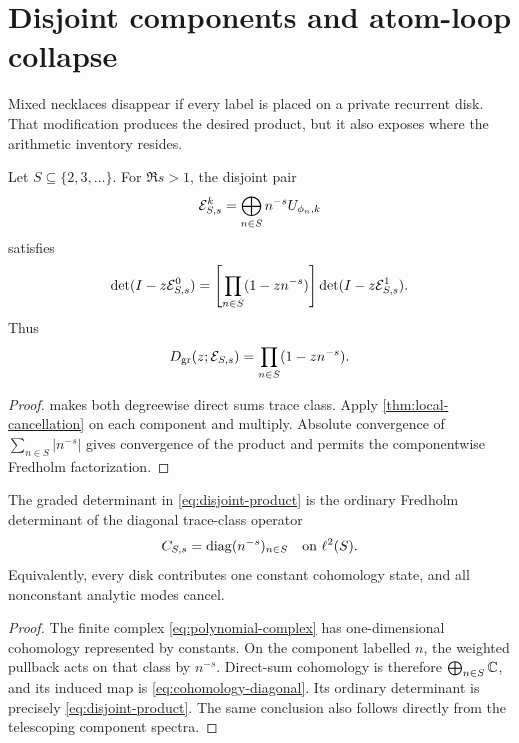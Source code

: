 \section{Disjoint components and atom-loop collapse}
\label{sec:disjoint}

Mixed necklaces disappear if every label is placed on a private recurrent
disk.  That modification produces the desired product, but it also exposes
where the arithmetic inventory resides.

\begin{theorem}
\label{thm:disjoint-factor}
Let \(S\subseteq\{2,3,\ldots\}\).  For \(\Re s>1\), the disjoint pair
\[
 \mathcal E^k_{S,s}=\bigoplus_{n\in S}n^{-s}U_{\phi_n,k}
\]
satisfies
\begin{equation}
 \det(I-z\mathcal E^0_{S,s})
 =\left[\prod_{n\in S}(1-zn^{-s})\right]
   \det(I-z\mathcal E^1_{S,s}).
 \label{eq:disjoint-det}
\end{equation}
Thus
\begin{equation}
        D_{\mathrm{gr}}(z;\mathcal E_{S,s})
        =\prod_{n\in S}(1-zn^{-s}).
 \label{eq:disjoint-product}
\end{equation}
\end{theorem}

\begin{proof}
 makes both degreewise direct sums trace class.  Apply
\cref{thm:local-cancellation} on each component and multiply.  Absolute
convergence of \(\sum_{n\in S}|n^{-s}|\) gives convergence of the product
and permits the componentwise Fredholm factorization.
\end{proof}

\begin{theorem}
\label{thm:atom-collapse}
The graded determinant in \eqref{eq:disjoint-product} is the ordinary
Fredholm determinant of the diagonal trace-class operator
\begin{equation}
        C_{S,s}=\operatorname{diag}(n^{-s})_{n\in S}
        \quad\text{on }\ell^2(S).
 \label{eq:cohomology-diagonal}
\end{equation}
Equivalently, every disk contributes one constant cohomology state, and all
nonconstant analytic modes cancel.
\end{theorem}

\begin{proof}
The finite complex \eqref{eq:polynomial-complex} has one-dimensional
cohomology represented by constants.  On the component labelled \(n\), the
weighted pullback acts on that class by \(n^{-s}\).  Direct-sum cohomology is
therefore \(\bigoplus_{n\in S}\mathbb C\), and its induced map is
\eqref{eq:cohomology-diagonal}.  Its ordinary determinant is precisely
\eqref{eq:disjoint-product}.  The same conclusion also follows directly
from the telescoping component spectra.
\end{proof}

